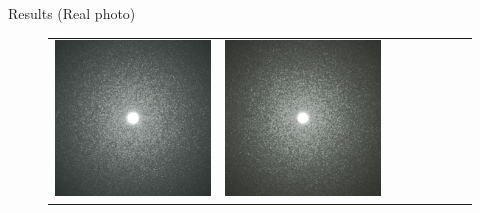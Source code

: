 \documentclass[final]{beamer}
\newlength{\twocolwid}
\newlength{\resultwidth}
\begin{document}
\begin{frame}[t]
\begin{columns}[t]
\begin{column}{\twocolwid}
\begin{block}{Results (Real photo)}
\begin{figure}[t]
\begin{tabular}{ccrclccc}
            		\includegraphics[width=\resultwidth]{images/real/flake/good2.jpg} &
            		\includegraphics[width=\resultwidth]{images/real/flake/good3.jpg} &

\end{tabular}
\end{figure}
\end{block}
\end{column}
\end{columns}
\end{frame}
\end{document}
